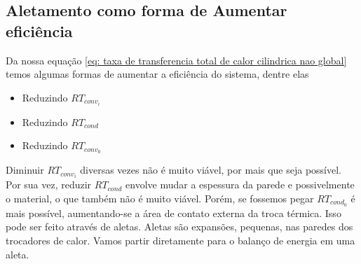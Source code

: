 \subsection{Aletamento como forma de Aumentar eficiência}
Da nossa equação \eqref{eq: taxa de transferencia total de calor cilindrica nao global} temos
algumas formas de aumentar a eficiência do sistema, dentre elas
\begin{itemize}
    \item Reduzindo \(RT_{conv_i} \) 
    \item Reduzindo \(RT_{cond} \)
    \item Reduzindo \(RT_{conv_0} \)
\end{itemize}
Diminuir \(RT_{conv_i} \) diversas vezes não é muito viável, por mais que seja possível. Por sua
vez, reduzir \(RT_{cond} \) envolve mudar a espessura da parede e possivelmente o material, o que
também não é muito viável. Porém, se fossemos pegar \(RT_{cond_0} \) é mais possível, aumentando-se
a área de contato externa da troca térmica. Isso pode ser feito através de aletas. Aletas são
expansões, pequenas, nas paredes dos trocadores de calor. Vamos partir diretamente para o balanço de
energia em uma aleta. \par

